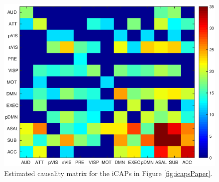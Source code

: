 \documentclass[10pt,conference,compsocconf]{IEEEtran}
\begin{document}
\begin{figure}%
    \centering
    \includegraphics[scale=0.5]{images/icap3.eps}%
    \vspace{-3mm}
    \caption{Estimated causality matrix for the iCAPs in Figure \ref{fig:icapsPaper}.}%
    \label{fig:icaps}
    \vspace{-3mm}
\end{figure}
\end{document}
